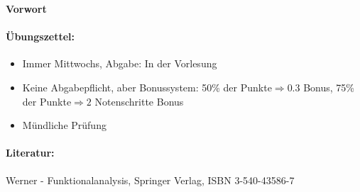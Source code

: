 \cleardoublepage
\thispagestyle{scrplain}

\vphantom{\Huge A}
\begin{flushright}\normalfont\sffamily\Huge\bfseries Vorwort\end{flushright}
\vspace{1cm}
\paragraph{\"Ubungszettel:}
\begin{itemize}
\item Immer Mittwochs, Abgabe: In der Vorlesung
\item Keine Abgabepflicht, aber Bonussystem: 50\% der Punkte$ \Rightarrow 0.3$ Bonus, 75\% der Punkte$ \Rightarrow 2$ Notenschritte Bonus
\item M\"undliche Pr\"ufung
\end{itemize}
\paragraph{Literatur:} Werner - Funktionalanalysis, Springer Verlag, ISBN 3-540-43586-7
